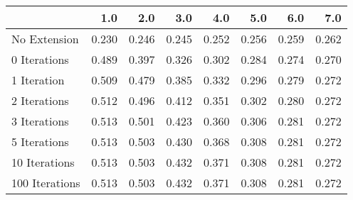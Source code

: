 \begin{tabular}{lrrrrrrr}
\toprule
{} &   1.0 &   2.0 &   3.0 &   4.0 &   5.0 &   6.0 &   7.0 \\
\midrule
No Extension   & 0.230 & 0.246 & 0.245 & 0.252 & 0.256 & 0.259 & 0.262 \\
0 Iterations   & 0.489 & 0.397 & 0.326 & 0.302 & 0.284 & 0.274 & 0.270 \\
1 Iteration    & 0.509 & 0.479 & 0.385 & 0.332 & 0.296 & 0.279 & 0.272 \\
2 Iterations   & 0.512 & 0.496 & 0.412 & 0.351 & 0.302 & 0.280 & 0.272 \\
3 Iterations   & 0.513 & 0.501 & 0.423 & 0.360 & 0.306 & 0.281 & 0.272 \\
5 Iterations   & 0.513 & 0.503 & 0.430 & 0.368 & 0.308 & 0.281 & 0.272 \\
10 Iterations  & 0.513 & 0.503 & 0.432 & 0.371 & 0.308 & 0.281 & 0.272 \\
100 Iterations & 0.513 & 0.503 & 0.432 & 0.371 & 0.308 & 0.281 & 0.272 \\
\bottomrule
\end{tabular}
